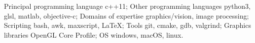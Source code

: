 
\begin{cvskills}
  \cvskill
    {Principal programming language \rightarrow}
    {c++11;}
  \cvskill
    {Other programming languages \rightarrow}
    {python3, glsl, matlab, objective-c;}
  \cvskill
    {Domains of expertise \rightarrow}
    {graphics/vision, image processing;}
  \cvskill
    {Scripting \rightarrow}
    {bash, awk, maxscript, LaTeX;}
  \cvskill
    {Tools \rightarrow}
    {git, cmake, gdb, valgrind;}
  \cvskill
    {Graphics libraries \rightarrow}
    {OpenGL Core Profile;}
  \cvskill
    {OS \rightarrow}
    {windows, macOS, linux.}
\end{cvskills}

%
